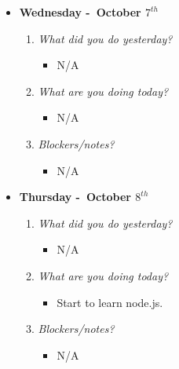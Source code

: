 \begin{itemize}
  \item[] \textbf{\large Wednesday -\ October \(7^{th}\)}
  \begin{enumerate}
    \item \textsl{What did you do yesterday?}
    \begin{itemize}
      \item N/A
    \end{itemize}
    \item \textsl{What are you doing today?}
    \begin{itemize}
      \item N/A
    \end{itemize}
    \item \textsl{Blockers/notes?}
    \begin{itemize}
      \item N/A
    \end{itemize}
  \end{enumerate}
\end{itemize}
\textbf{}
\begin{itemize}
  \item[] \textbf{\large Thursday -\ October \(8^{th}\)}
  \begin{enumerate}
    \item \textsl{What did you do yesterday?}
    \begin{itemize}
      \item N/A
    \end{itemize}
    \item \textsl{What are you doing today?}
    \begin{itemize}
      \item Start to learn node.js.
    \end{itemize}
    \item \textsl{Blockers/notes?}
    \begin{itemize}
      \item N/A
    \end{itemize}
  \end{enumerate}
\end{itemize}
\textbf{}
